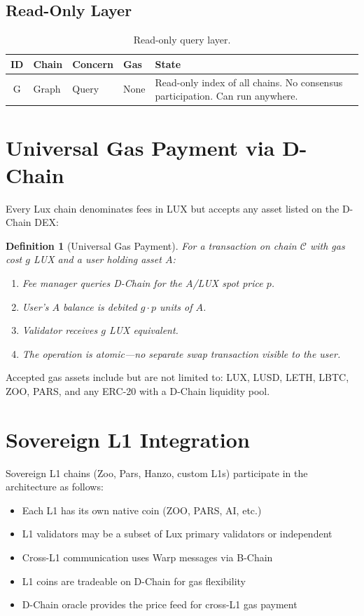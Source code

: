 \documentclass[11pt,a4paper]{article}
\newtheorem{definition}{Definition}
\begin{document}
\subsection{Read-Only Layer}

\begin{table}[h]
\centering
\begin{tabular}{clllp{6cm}}
\toprule
\textbf{ID} & \textbf{Chain} & \textbf{Concern} & \textbf{Gas} & \textbf{State} \\
\midrule
G & Graph & Query & None & Read-only index of all chains. No consensus participation. Can run anywhere. \\
\bottomrule
\end{tabular}
\caption{Read-only query layer.}
\end{table}

\section{Universal Gas Payment via D-Chain}

Every Lux chain denominates fees in LUX but accepts any asset listed on the D-Chain DEX:

\begin{definition}[Universal Gas Payment]
For a transaction on chain $\mathcal{C}$ with gas cost $g$ LUX and a user holding asset $A$:
\begin{enumerate}
\item Fee manager queries D-Chain for the $A$/LUX spot price $p$.
\item User's $A$ balance is debited $g \cdot p$ units of $A$.
\item Validator receives $g$ LUX equivalent.
\item The operation is atomic---no separate swap transaction visible to the user.
\end{enumerate}
\end{definition}

Accepted gas assets include but are not limited to: LUX, LUSD, LETH, LBTC, ZOO, PARS, and any ERC-20 with a D-Chain liquidity pool.

\section{Sovereign L1 Integration}

Sovereign L1 chains (Zoo, Pars, Hanzo, custom L1s) participate in the architecture as follows:

\begin{itemize}
\item Each L1 has its own native coin (ZOO, PARS, AI, etc.)
\item L1 validators may be a subset of Lux primary validators or independent
\item Cross-L1 communication uses Warp messages via B-Chain
\item L1 coins are tradeable on D-Chain for gas flexibility
\item D-Chain oracle provides the price feed for cross-L1 gas payment
\end{itemize}
\end{document}

